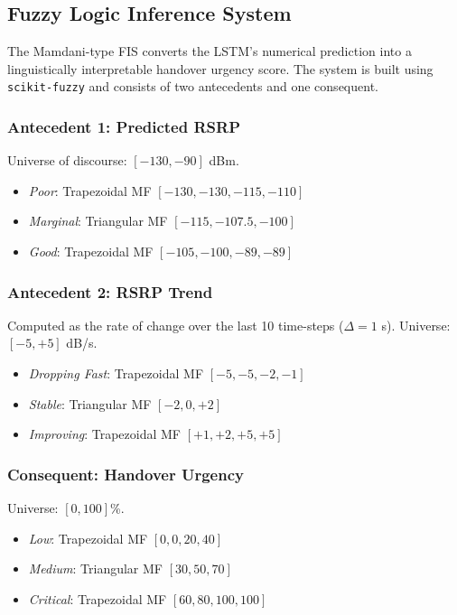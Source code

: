 \documentclass[conference]{IEEEtran}
\begin{document}
\subsection{Fuzzy Logic Inference System}

The Mamdani-type FIS converts the LSTM's numerical prediction into a linguistically interpretable handover urgency score. The system is built using \texttt{scikit-fuzzy} and consists of two antecedents and one consequent.

\subsubsection{Antecedent 1: Predicted RSRP}
Universe of discourse: $[-130, -90]$ dBm.
\begin{itemize}
    \item \textit{Poor}: Trapezoidal MF $[-130, -130, -115, -110]$
    \item \textit{Marginal}: Triangular MF $[-115, -107.5, -100]$
    \item \textit{Good}: Trapezoidal MF $[-105, -100, -89, -89]$
\end{itemize}

\subsubsection{Antecedent 2: RSRP Trend}
Computed as the rate of change over the last 10 time-steps ($\Delta = 1$ s). Universe: $[-5, +5]$ dB/s.
\begin{itemize}
    \item \textit{Dropping Fast}: Trapezoidal MF $[-5, -5, -2, -1]$
    \item \textit{Stable}: Triangular MF $[-2, 0, +2]$
    \item \textit{Improving}: Trapezoidal MF $[+1, +2, +5, +5]$
\end{itemize}

\subsubsection{Consequent: Handover Urgency}
Universe: $[0, 100]$\%.
\begin{itemize}
    \item \textit{Low}: Trapezoidal MF $[0, 0, 20, 40]$
    \item \textit{Medium}: Triangular MF $[30, 50, 70]$
    \item \textit{Critical}: Trapezoidal MF $[60, 80, 100, 100]$
\end{itemize}
\end{document}
